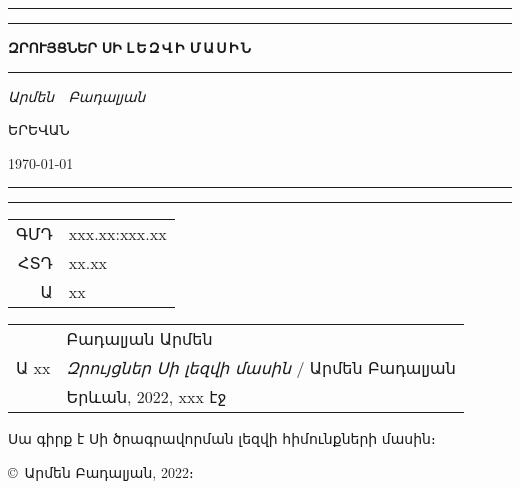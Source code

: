 
\begin{titlepage}
\begingroup
\newlength\drop{}\textheight

\setlength{\parindent}{0pt}

\rule{\textwidth}{1pt}\par
\vspace{2pt}\vspace{-\baselineskip}
\rule{\textwidth}{0.4pt}\par

\vspace\drop
\centering

{\fontsize{42}{42}\selectfont\textbf{Զ\;Ր\;ՈՒ\;Յ\;Ց\;Ն\;Ե\;Ր}}
\null\vskip12pt\null
{\fontsize{64}{64}\selectfont\textbf{Ս\;Ի}}
\null\vskip12pt\null
{\fontsize{32}{32}\selectfont\textbf{Լ\,Ե\,Զ\,Վ\,Ի\; Մ\,Ա\,Ս\,Ի\,Ն}}

\vspace{0.25\drop}
\rule{0.3\textwidth}{0.4pt}\par
\vspace{\drop}

{\Large \textit{Արմեն~~Բադալյան}}


\vfill

{\large ԵՐԵՎԱՆ}

{\large\today}

\rule{\textwidth}{0.4pt}\par
\vspace{2pt}\vspace{-\baselineskip}
\rule{\textwidth}{1pt}\par

\endgroup

\end{titlepage}



\begin{titlepage}

\begingroup
\small\sffamily\linespread{1}
\begin{tabular}{rl}
ԳՄԴ & xxx.xx:xxx.xx \\
ՀՏԴ & xx.xx \\
Ա & xx \\
\end{tabular}
\endgroup

\vskip2cm

\begin{tabular}{rl}
     & Բադալյան Արմեն \\
Ա xx & \textsl{Զրույցներ Սի լեզվի մասին} / Արմեն Բադալյան \\
     & Երևան, 2022, xxx էջ
\end{tabular}

\vskip1cm

\begingroup\small
Սա գիրք է Սի ծրագրավորման լեզվի հիմունքների մասին։
\endgroup

\vfill
\textsf{\copyright\ Արմեն Բադալյան, 2022։}

\end{titlepage}
